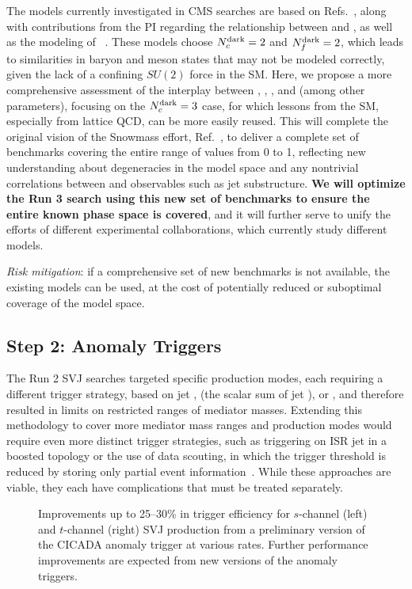 The models currently investigated in CMS searches are based on Refs.~\cite{Cohen:2015toa,Cohen:2017pzm}, along with contributions from the PI
regarding the relationship between \mdark and \Lamdark, as well as the modeling of \rinv~\cite{Albouy:2022cin}.
These models choose $N_{c}^{\text{dark}}=2$ and $N_{f}^{\text{dark}}=2$, which leads to similarities in baryon and meson states that may not be modeled correctly,
given the lack of a confining $SU(2)$ force in the SM.
Here, we propose a more comprehensive assessment of the interplay between \Nfdark, \Lamdark, \mdark, and \mqdark (among other parameters),
focusing on the $N_{c}^{\text{dark}}=3$ case, for which lessons from the SM, especially from lattice QCD, can be more easily reused.
This will complete the original vision of the Snowmass effort, Ref.~\cite{Albouy:2022cin},
to deliver a complete set of benchmarks covering the entire range of \rinv values from 0 to 1,
reflecting new understanding about degeneracies in the model space and any nontrivial correlations between \rinv and observables such as jet substructure.
\textbf{We will optimize the Run 3 search using this new set of benchmarks to ensure the entire known phase space is covered},
and it will further serve to unify the efforts of different experimental collaborations, which currently study different models.

\textit{Risk mitigation}: if a comprehensive set of new benchmarks is not available, the existing models can be used, at the cost of potentially reduced or suboptimal coverage of the model space.

\subsection{Step 2: Anomaly Triggers}\label{subsec:trig}

The Run 2 SVJ searches targeted specific production modes, each requiring a different trigger strategy, based on jet \pt, \HT (the scalar sum of jet \pt), or \ptmiss,
and therefore resulted in limits on restricted ranges of mediator masses.
Extending this methodology to cover more mediator mass ranges and production modes would require even more distinct trigger strategies,
such as triggering on ISR jet \pt in a boosted topology or the use of data scouting, in which the \HT trigger threshold is reduced by storing only partial event information~\cite{Mukherjee:2019anz}.
While these approaches are viable, they each have complications that must be treated separately.

\begin{figure}[htb!]
\centering
{}
\caption{Improvements up to 25--30\% in trigger efficiency for $s$-channel (left) and $t$-channel (right) SVJ production
from a preliminary version of the CICADA anomaly trigger at various rates.
Further performance improvements are expected from new versions of the anomaly triggers.}
\label{fig:svjanomaly}
\end{figure}

